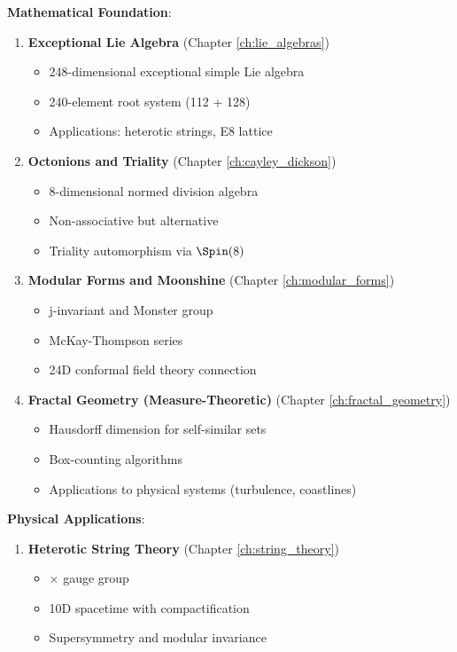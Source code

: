 \begin{framework}
\textbf{Mathematical Foundation}:
\begin{enumerate}
    \item \textbf{Exceptional Lie Algebra } (Chapter \ref{ch:lie_algebras})
    \begin{itemize}
        \item 248-dimensional exceptional simple Lie algebra
        \item 240-element root system (112 + 128)
        \item Applications: heterotic strings, E8 lattice
    \end{itemize}

    \item \textbf{Octonions and Triality} (Chapter \ref{ch:cayley_dickson})
    \begin{itemize}
        \item 8-dimensional normed division algebra
        \item Non-associative but alternative
        \item Triality automorphism via $\Spin(8)$
    \end{itemize}

    \item \textbf{Modular Forms and Moonshine} (Chapter \ref{ch:modular_forms})
    \begin{itemize}
        \item j-invariant and Monster group
        \item McKay-Thompson series
        \item 24D conformal field theory connection
    \end{itemize}

    \item \textbf{Fractal Geometry (Measure-Theoretic)} (Chapter \ref{ch:fractal_geometry})
    \begin{itemize}
        \item Hausdorff dimension for self-similar sets
        \item Box-counting algorithms
        \item Applications to physical systems (turbulence, coastlines)
    \end{itemize}
\end{enumerate}

\textbf{Physical Applications}:
\begin{enumerate}
    \item \textbf{ Heterotic String Theory} (Chapter \ref{ch:string_theory})
    \begin{itemize}
        \item {} $\times$  gauge group
        \item 10D spacetime with compactification
        \item Supersymmetry and modular invariance
    \end{itemize}


\end{enumerate}
\end{framework}
